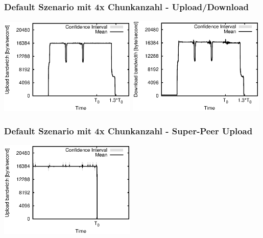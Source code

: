 \begin{frame}
  \frametitle{Default Szenario mit 4x Chunkanzahl - Upload/Download}
  \begin{center}
    \includegraphics[width=0.49\textwidth]{fig/plots/scenario_15_chunk_count_fac_4/plots/GeneratedMeanCurrentUploadBandwidth.csv.eps}
    \includegraphics[width=0.49\textwidth]{fig/plots/scenario_15_chunk_count_fac_4/plots/GeneratedMeanCurrentDownloadBandwidth.csv.eps}
  \end{center}
\end{frame}


\begin{frame}
  \frametitle{Default Szenario mit 4x Chunkanzahl - Super-Peer Upload}
  \begin{center}
    \includegraphics[width=0.49\textwidth]{fig/plots/scenario_15_chunk_count_fac_4/plots/GeneratedMeanCurrentSuperSeederUploadBandwidth.csv.eps}
  \end{center}
\end{frame}



